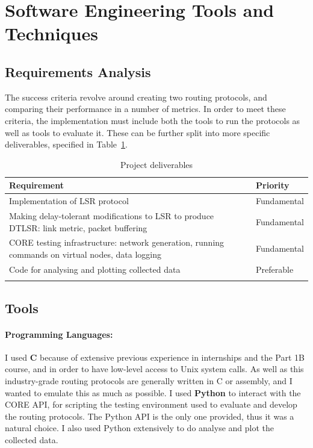 \documentclass[withindex,glossary,openany]{cam-thesis}
\begin{document}
\section{Software Engineering Tools and Techniques}

\subsection{Requirements Analysis}

The success criteria revolve around creating two routing protocols, and comparing their performance in a number of metrics. In order to meet these criteria, the implementation must include both the tools to run the protocols as well as tools to evaluate it. These can be further split into more specific deliverables,
specified in Table~\ref{table:requirements}.

\begin{table}[H]
\begin{tabularx}{\textwidth}{Xl}
\hline
\textbf{Requirement} & \textbf{Priority} \\
\hline
Implementation of LSR protocol & Fundamental \\
Making delay-tolerant modifications to LSR to produce DTLSR: link metric, packet buffering & Fundamental \\
CORE testing infrastructure: network generation, running commands on virtual nodes, data logging & Fundamental \\
Code for analysing and plotting collected data & Preferable \\
 & \\
\hline
\end{tabularx}
\caption{Project deliverables}
\label{table:requirements}
\end{table}

\subsection{Tools}

\paragraph{Programming Languages:}

I used \textbf{C} because of extensive previous experience in internships and the Part 1B course, and in order to have low-level access to Unix system calls. As well as this industry-grade routing protocols are generally written in C or assembly, and I wanted to emulate this as much as possible. I used \textbf{Python} to interact with the CORE API, for scripting the testing environment used to evaluate and develop the routing protocols. The Python API is the only one provided, thus it was a natural choice. I also used Python extensively to do analyse and plot the collected data.
\end{document}

